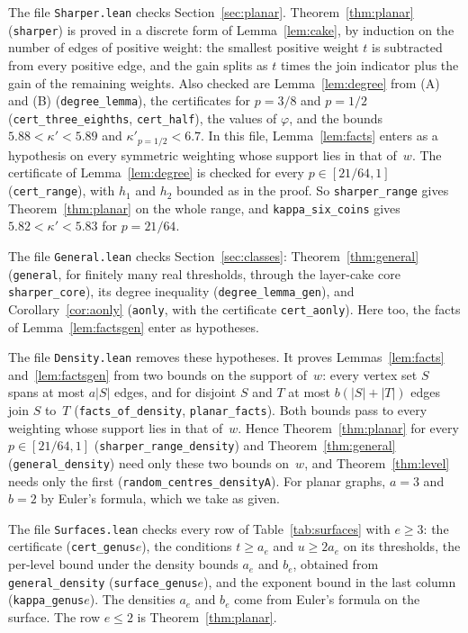 \documentclass[11pt]{article}
\theoremstyle{remark}
\begin{document}
The file \texttt{Sharper.lean} checks Section~\ref{sec:planar}. Theorem~\ref{thm:planar}
(\texttt{sharper}) is proved in a discrete form of Lemma~\ref{lem:cake}, by induction on the number
of edges of positive weight: the smallest positive weight $t$ is subtracted from every positive
edge, and the gain splits as $t$ times the join indicator plus the gain of the remaining weights.
Also checked are Lemma~\ref{lem:degree} from (A) and (B) (\texttt{degree\_lemma}), the certificates for
$p=3/8$ and $p=1/2$ (\texttt{cert\_three\_eighths}, \texttt{cert\_half}), the values of $\varphi$, and
the bounds $5.88<\kappa'<5.89$ and $\kappa'_{p=1/2}<6.7$. In this file, Lemma~\ref{lem:facts}
enters as a hypothesis on every symmetric weighting whose support lies in that of~$w$. The certificate of
Lemma~\ref{lem:degree} is checked for every $p\in[21/64,1]$ (\texttt{cert\_range}), with $h_1$ and $h_2$
bounded as in the proof. So \texttt{sharper\_range} gives Theorem~\ref{thm:planar} on the whole range,
and \texttt{kappa\_six\_coins} gives $5.82<\kappa'<5.83$ for $p=21/64$.

The file \texttt{General.lean} checks Section~\ref{sec:classes}: Theorem~\ref{thm:general}
(\texttt{general}, for finitely many real thresholds, through the layer-cake core
\texttt{sharper\_core}), its degree inequality (\texttt{degree\_lemma\_gen}), and
Corollary~\ref{cor:aonly} (\texttt{aonly}, with the certificate \texttt{cert\_aonly}). Here too, the
facts of Lemma~\ref{lem:factsgen} enter as hypotheses.

The file \texttt{Density.lean} removes these hypotheses. It proves Lemmas~\ref{lem:facts}
and~\ref{lem:factsgen} from two bounds on the support of~$w$: every vertex set $S$ spans at most
$a|S|$ edges, and for disjoint $S$ and $T$ at most $b(|S|+|T|)$ edges join $S$ to~$T$
(\texttt{facts\_of\_density}, \texttt{planar\_facts}). Both bounds pass to every weighting whose
support lies in that of~$w$. Hence Theorem~\ref{thm:planar} for every $p\in[21/64,1]$
(\texttt{sharper\_range\_density}) and Theorem~\ref{thm:general} (\texttt{general\_density}) need only
these two bounds on~$w$, and Theorem~\ref{thm:level} needs only the first
(\texttt{random\_centres\_densityA}). For planar graphs, $a=3$ and $b=2$ by Euler's formula, which
we take as given.

The file \texttt{Surfaces.lean} checks every row of
Table~\ref{tab:surfaces} with $e\ge3$: the certificate (\texttt{cert\_genus}$e$), the conditions $t\ge a_e$
and $u\ge2a_e$ on its thresholds, the per-level bound under the density bounds $a_e$ and $b_e$,
obtained from \texttt{general\_density} (\texttt{surface\_genus}$e$), and the exponent bound in the
last column (\texttt{kappa\_genus}$e$). The densities $a_e$ and $b_e$ come from Euler's formula on the
surface. The row $e\le2$ is Theorem~\ref{thm:planar}.
\end{document}
